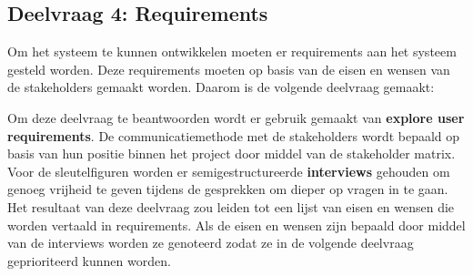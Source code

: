 \subsection{Deelvraag 4: Requirements}
Om het systeem te kunnen ontwikkelen moeten er requirements aan het systeem gesteld worden.
Deze requirements moeten op basis van de eisen en wensen van de stakeholders gemaakt worden.
Daarom is de volgende deelvraag gemaakt:

\begin{center}
 \textit{\SubquestionFour}
\end{center}

\whitespace[0.2]
Om deze deelvraag te beantwoorden wordt er gebruik gemaakt van \textbf{explore user requirements}.
De communicatiemethode met de stakeholders wordt bepaald op basis van hun positie binnen het project door middel van de stakeholder matrix.
Voor de sleutelfiguren worden er semigestructureerde \textbf{interviews} gehouden om genoeg vrijheid te geven tijdens de gesprekken om dieper op vragen in te gaan.
Het resultaat van deze deelvraag zou leiden tot een lijst van eisen en wensen die worden vertaald in requirements.
Als de eisen en wensen zijn bepaald door middel van de interviews worden ze genoteerd zodat ze in de volgende deelvraag geprioriteerd kunnen worden.

